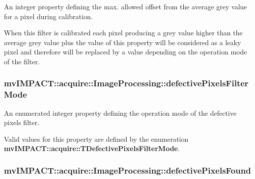 An integer property defining the max. allowed offset from the average grey value for a pixel during calibration. 

When this filter is calibrated each pixel producing a grey value higher than the average grey value plus the value of this property will be considered as a leaky pixel and therefore will be replaced by a value depending on the operation mode of the filter. \hypertarget{classmv_i_m_p_a_c_t_1_1acquire_1_1_image_processing_ae1e060a70ed836297ef3886db0bf8a95}{
\subsubsection[{defective\+Pixels\+Filter\+Mode}]{ mv\+I\+M\+P\+A\+C\+T\+::acquire\+::\+Image\+Processing\+::defective\+Pixels\+Filter\+Mode}}\label{classmv_i_m_p_a_c_t_1_1acquire_1_1_image_processing_ae1e060a70ed836297ef3886db0bf8a95}


An enumerated integer property defining the operation mode of the defective pixels filter. 

Valid values for this property are defined by the enumeration {\bfseries mv\+I\+M\+P\+A\+C\+T\+::acquire\+::\+T\+Defective\+Pixels\+Filter\+Mode}. \hypertarget{classmv_i_m_p_a_c_t_1_1acquire_1_1_image_processing_adcd6475ebbec9d0d3f0968a0e383449d}{
\subsubsection[{defective\+Pixels\+Found}]{ mv\+I\+M\+P\+A\+C\+T\+::acquire\+::\+Image\+Processing\+::defective\+Pixels\+Found}}\label{classmv_i_m_p_a_c_t_1_1acquire_1_1_image_processing_adcd6475ebbec9d0d3f0968a0e383449d}


